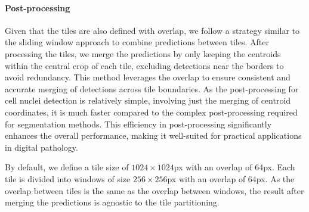 \paragraph{Post-processing}
Given that the tiles are also defined with overlap, we follow a strategy similar to the sliding window approach to combine predictions between tiles. After processing the tiles, we merge the predictions by only keeping the centroids within the central crop of each tile, excluding detections near the borders to avoid redundancy. This method leverages the overlap to ensure consistent and accurate merging of detections across tile boundaries. As the post-processing for cell nuclei detection is relatively simple, involving just the merging of centroid coordinates, it is much faster compared to the complex post-processing required for segmentation methods. This efficiency in post-processing significantly enhances the overall performance, making it well-suited for practical applications in digital pathology.

By default, we define a tile size of $1024 \times 1024$px with an overlap of 64px. Each tile is divided into windows of size $256 \times 256$px with an overlap of 64px. As the overlap between tiles is the same as the overlap between windows, the result after merging the predictions is agnostic to the tile partitioning.


